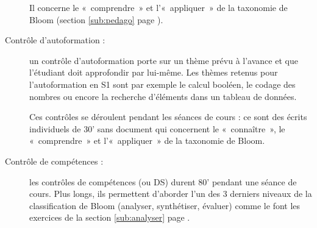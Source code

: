 \begin{description}
	Il concerne le «~comprendre~» et l'«~appliquer~» de la taxonomie de Bloom
	(section \ref{sub:pedago} page \pageref{sub:pedago}).
\item[Contrôle d'autoformation :] \mbox{}
	un contrôle d'autoformation porte sur un thème
	prévu à l'avance et que l'étudiant doit approfondir par lui-même. Les thèmes 
	retenus pour l'autoformation en S1 sont par exemple le calcul booléen,
	le codage des nombres ou encore la recherche d'éléments dans un tableau de données.

	Ces contrôles se déroulent pendant les séances de cours : 
	ce sont des écrits individuels de 30' sans document qui concernent
	le «~connaître~», le «~comprendre~» et l'«~appliquer~» de la taxonomie de Bloom.
\item[Contrôle de compétences :] \mbox{}
	les contrôles de compétences (ou DS) durent 80'
	pendant une séance de cours. Plus longs, ils permettent d'aborder l'un des 3 
	derniers niveaux de la classification de Bloom (analyser, synthétiser, évaluer)
	comme le font les exercices de la section \ref{sub:analyser} page \pageref{sub:analyser}.
\end{description}

